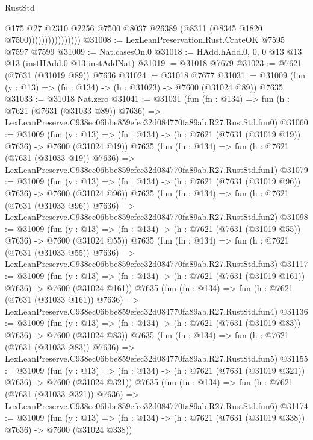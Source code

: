 \begin{lexlean}{RustStd}
\begin{coremodule}
                                @175
                                @27
                                @2310
                                @2256
                                @7500
                                @8037
                                @26389
                                (@8311 (@8345 @1820 @7500))))))))))))))))
@31008 := LexLeanPreservation.Rust.CrateOK @7595 @7597 @7599
@31009 := Nat.casesOn.{0}
@31018 := HAdd.hAdd.{0, 0, 0} @13 @13 @13 (instHAdd.{0} @13 instAddNat)
@31019 := @31018 @7679
@31023 := @7621 (@7631 (@31019 @89)) @7636
@31024 := @31018 @7677
@31031 := @31009 (fun (y : @13) => (fn : @134) -> (h : @31023) -> @7600 (@31024 @89)) @7635
@31033 := @31018 Nat.zero
@31041 := @31031
    (fun (fn : @134) =>
    fun (h : @7621 (@7631 (@31033 @89)) @7636) =>
    LexLeanPreserve.C938ec06bbe859efec32d084770fa89ab.R27.RustStd.fun0)
@31060 := @31009
    (fun (y : @13) => (fn : @134) -> (h : @7621 (@7631 (@31019 @19)) @7636) -> @7600 (@31024 @19))
    @7635
    (fun (fn : @134) =>
    fun (h : @7621 (@7631 (@31033 @19)) @7636) =>
    LexLeanPreserve.C938ec06bbe859efec32d084770fa89ab.R27.RustStd.fun1)
@31079 := @31009
    (fun (y : @13) => (fn : @134) -> (h : @7621 (@7631 (@31019 @96)) @7636) -> @7600 (@31024 @96))
    @7635
    (fun (fn : @134) =>
    fun (h : @7621 (@7631 (@31033 @96)) @7636) =>
    LexLeanPreserve.C938ec06bbe859efec32d084770fa89ab.R27.RustStd.fun2)
@31098 := @31009
    (fun (y : @13) => (fn : @134) -> (h : @7621 (@7631 (@31019 @55)) @7636) -> @7600 (@31024 @55))
    @7635
    (fun (fn : @134) =>
    fun (h : @7621 (@7631 (@31033 @55)) @7636) =>
    LexLeanPreserve.C938ec06bbe859efec32d084770fa89ab.R27.RustStd.fun3)
@31117 := @31009
    (fun (y : @13) => (fn : @134) -> (h : @7621 (@7631 (@31019 @161)) @7636) -> @7600 (@31024 @161))
    @7635
    (fun (fn : @134) =>
    fun (h : @7621 (@7631 (@31033 @161)) @7636) =>
    LexLeanPreserve.C938ec06bbe859efec32d084770fa89ab.R27.RustStd.fun4)
@31136 := @31009
    (fun (y : @13) => (fn : @134) -> (h : @7621 (@7631 (@31019 @83)) @7636) -> @7600 (@31024 @83))
    @7635
    (fun (fn : @134) =>
    fun (h : @7621 (@7631 (@31033 @83)) @7636) =>
    LexLeanPreserve.C938ec06bbe859efec32d084770fa89ab.R27.RustStd.fun5)
@31155 := @31009
    (fun (y : @13) => (fn : @134) -> (h : @7621 (@7631 (@31019 @321)) @7636) -> @7600 (@31024 @321))
    @7635
    (fun (fn : @134) =>
    fun (h : @7621 (@7631 (@31033 @321)) @7636) =>
    LexLeanPreserve.C938ec06bbe859efec32d084770fa89ab.R27.RustStd.fun6)
@31174 := @31009
    (fun (y : @13) => (fn : @134) -> (h : @7621 (@7631 (@31019 @338)) @7636) -> @7600 (@31024 @338))

\end{coremodule}
\end{lexlean}
